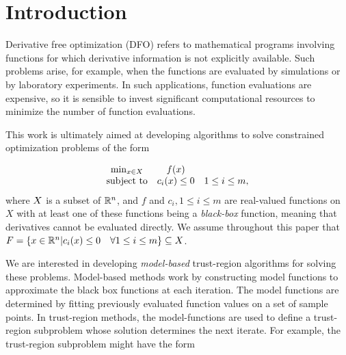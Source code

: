 
\section{Introduction}

Derivative free optimization (DFO) refers to mathematical programs involving functions for which derivative information is not explicitly available.
Such problems arise, for example, when the functions are evaluated by simulations or by laboratory experiments.
In such applications, function evaluations are expensive, so it is sensible to invest significant computational resources to minimize the number of function evaluations.

This work is ultimately aimed at developing algorithms to solve constrained optimization problems of the form 

\[ \begin{array}{ccl} \min_{x \in X} & f(x) \\
\mbox{subject to} & c_i(x) \le 0 & 1 \le i \le m,
\end{array}
\]
where $X$ is a subset of $\mathbb R^n$, and $f$ and $c_i, 1 \le i \le m$ are real-valued functions on $X$ with at least one of these functions being a {\em black-box} function, meaning that derivatives cannot be evaluated directly.
We assume throughout this paper that ${F} = \{x \in \mathbb R^n | c_i(x) \le 0 \quad \forall 1 \le i \le m \} \subseteq X$.



We are interested in developing {\em model-based} trust-region algorithms for solving these problems.
Model-based methods work by constructing model functions to approximate the black box functions at each iteration.
The model functions are determined by fitting previously evaluated function values on a set of sample points.
In trust-region methods, the model-functions are used to define a trust-region subproblem whose solution determines the next iterate.
For example, the trust-region subproblem might have the form

